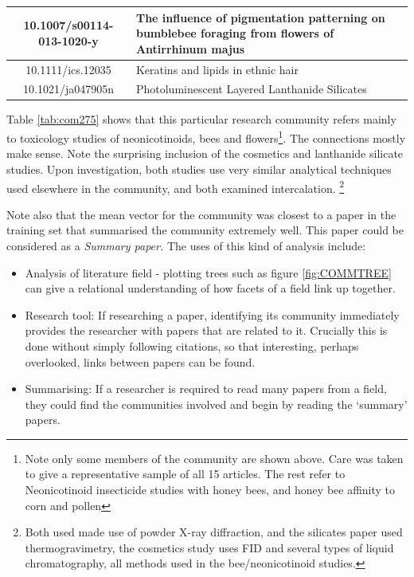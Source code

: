 \begin{table}[H]
\begin{tabular}{||c|X||}
10.1007/s00114-013-1020-y        & \footnotesize{The influence of pigmentation patterning on bumblebee foraging from flowers of Antirrhinum majus                                                                  } \\ \hline
10.1111/ics.12035                & \footnotesize{ Keratins and lipids in ethnic hair                                                                                                                                } \\ \hline
10.1021/ja047905n                & \footnotesize{Photoluminescent Layered Lanthanide Silicates                                                                                                                     } \\ \hline
\end{tabular}
\end{table}

Table \ref{tab:com275} shows that this particular research community refers mainly to toxicology studies of neonicotinoids,  bees and flowers\footnote{Note only some members of the community are shown above. Care was taken to give a representative sample of all 15 articles. The rest refer to Neonicotinoid insecticide studies with honey bees, and honey bee affinity to corn and pollen}. The connections mostly make sense. Note the surprising inclusion of the cosmetics and lanthanide silicate studies. Upon investigation, both studies use very similar analytical techniques used elsewhere in the community, and both examined intercalation.
\footnote{Both used made use of powder X-ray diffraction, and the silicates paper used thermogravimetry, the cosmetics study uses FID and several types of liquid chromatography, all methods used in the bee/neonicotinoid studies.}

Note also that the mean vector for the community was closest to a paper in the training set that summarised the community extremely well. This paper could be considered as a \emph{Summary paper.}
The uses of this kind of analysis include:
\begin{itemize}
\item Analysis of literature field - plotting trees such as figure \ref{fig:COMMTREE} can give a relational understanding of how facets of a field link up together. 
\item Research tool: If researching a paper, identifying its community immediately provides the researcher with papers that are related to it. Crucially this is done without simply following citations, so that interesting, perhaps overlooked, links between papers can be found.
\item Summarising: If a researcher is required to read many papers from a field, they could find the communities involved and begin by reading the `summary' papers. 
\end{itemize}

